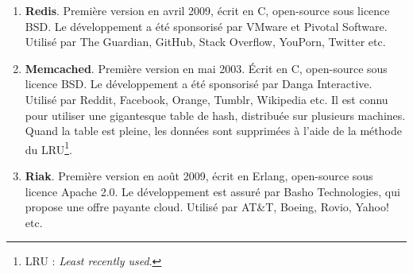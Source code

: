 	\begin{enumerate}
		\item \textbf{Redis}. Première version en avril 2009, écrit en C, open-source sous licence BSD. Le développement a été sponsorisé par VMware et Pivotal Software. Utilisé par The Guardian, GitHub, Stack Overflow, YouPorn, Twitter etc.\cite{Wikipedia_redis}
		\item \textbf{Memcached}. Première version en mai 2003. Écrit en C, open-source sous licence BSD. Le développement a été sponsorisé par Danga Interactive. Utilisé par Reddit, Facebook, Orange, Tumblr, Wikipedia etc. Il est connu pour utiliser une gigantesque table de hash, distribuée sur plusieurs machines. Quand la table est pleine, les données sont supprimées à l'aide de la méthode du LRU\footnote{LRU : \textit{Least recently used}.}.\cite{Wikipedia_memcached}
		\item \textbf{Riak}. Première version en août 2009, écrit en Erlang, open-source sous licence Apache 2.0. Le développement est assuré par Basho Technologies, qui propose une offre payante cloud. Utilisé par AT\&T, Boeing, Rovio, Yahoo! etc.\cite{Wikipedia_riak}
	\end{enumerate}
